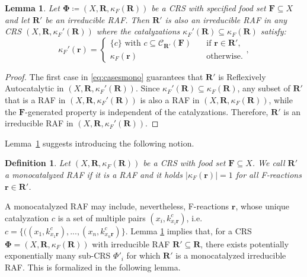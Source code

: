 \documentclass[pdflatex]{sn-jnl}
\theoremstyle{thmstyleone}%
\newtheorem{lemma}[theorem]{Lemma}%
\theoremstyle{examplesty}%
\theoremstyle{thmstylethree}%
\newtheorem{definition}[theorem]{Definition}%
\newcommand{\food}{\ensuremath{\mathbf{F}}}
\newcommand{\closure}[2]{\mathscr{C}_{#1}(#2)}
\newcommand{\FR}[0]{\mathbf{R}}
\newcommand{\fr}[0]{\mathbf{r}}
\newcommand{\RAF}[0]{\mathbf{R}'}
\newcommand{\cat}{\kappa_F}
\begin{document}
\vspace{6pt}
\begin{lemma}\label{lem:mono}
  Let $\mathbf{\Phi}\coloneqq (X,\FR,\cat(\FR))$ be a CRS with specified
  \emph{food set} $\food\subseteq X$ and let $\RAF$ be an irreducible
  RAF. Then $\RAF$ is also an irreducible RAF in any CRS
  $(X, \FR,\cat'(\FR))$ where the catalyzations
  $\cat'(\FR)\subseteq\cat(\FR)$ satisfy:
  \begin{equation}\label{eq:casesmono}\cat'(\fr)=\begin{cases}
    \{c\}\text{ with $c\subseteq \closure{\RAF}{\food}$}\quad
    &\text{if $\fr\in \RAF$,}\\ 
    \cat(\fr)&\text{otherwise.}
  \end{cases}, 
\end{equation}
\end{lemma}
\begin{proof}
  The first case in \eqref{eq:casesmono} guarantees that $\RAF$ is
  Reflexively Autocatalytic in $(X, \FR,\cat'(\FR))$. Since
  $\cat'(\FR)\subseteq\cat(\FR)$, any subset of $\RAF$ that is a RAF in
  $(X,\FR,\cat'(\FR))$ is also a RAF in $(X,\FR,\cat(\FR))$, while the
  $\food$-generated property is independent of the catalyzations. Therefore, $\RAF$ is an irreducible RAF in
  $(X, \FR,\cat'(\FR))$.
\end{proof}


Lemma~\ref{lem:mono} suggests introducing the following notion.
\vspace{6pt}
\begin{definition}
  Let $(X,\FR,\cat(\FR))$ be a CRS with \emph{food set}
  $\food\subseteq X$. We call $\RAF$ a \emph{monocatalyzed} RAF if it is a
  RAF and it holds $|\cat(\fr)|=1$ for all F-reactions $\fr \in \RAF$.
\end{definition}

A monocatalyzed RAF may include, nevertheless, F-reactions
$\fr$, whose unique catalyzation $c$ is a set of multiple pairs
$(x_i, k^c_{x_i\fr})$, i.e.
$c=\{((x_1, k^c_{x_1\fr}),..., (x_n, k^c_{x_n\fr})\}$. Lemma \ref{lem:mono}
implies that, for a CRS $\mathbf{\Phi}=(X,\FR,\cat(\FR))$ with irreducible
RAF $\RAF\subseteq\FR$, there exists potentially exponentially many sub-CRS $\Phi'_i$
for which $\RAF$ is a monocatalyzed irreducible RAF. This is formalized in
the following lemma.
\end{document}
